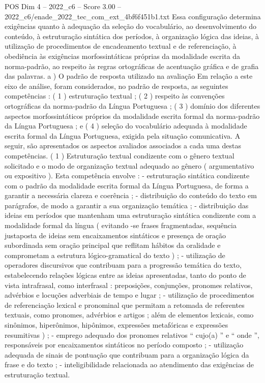 \begin{textsample}{POS Dim 4 – 2022\_c6 – Score 3.00 – 2022\_c6/enade\_2022\_tec\_com\_ext\_4bf6f451b1.txt}
Essa configuração determina exigências quanto à adequação da seleção do vocabulário, ao desenvolvimento do conteúdo, à estruturação sintática dos períodos, à organização lógica das ideias, à utilização de procedimentos de encadeamento textual e de referenciação, à obediência às exigências morfossintáticas próprias da modalidade escrita da norma-padrão, ao respeito às regras ortográficas de acentuação gráfica e de grafia das palavras. a ) O padrão de resposta utilizado na avaliação Em relação a este eixo de análise, foram considerados, no padrão de resposta, as seguintes competências : ( 1 ) estruturação textual ; ( 2 ) respeito às convenções ortográficas da norma-padrão da Língua Portuguesa ; ( 3 ) domínio dos diferentes aspectos morfossintáticos próprios da modalidade escrita formal da norma-padrão da Língua Portuguesa ; e ( 4 ) seleção do vocabulário adequada à modalidade escrita formal da Língua Portuguesa, exigida pela situação comunicativa.
A seguir, são apresentados os aspectos avaliados associados a cada uma destas competências. ( 1 ) Estruturação textual condizente com o gênero textual solicitado e o modo de organização textual adequado ao gênero ( argumentativo ou expositivo ).
Esta competência envolve : - estruturação sintática condizente com o padrão da modalidade escrita formal da Língua Portuguesa, de forma a garantir a necessária clareza e coerência ; - distribuição do conteúdo do texto em parágrafos, de modo a garantir a sua organização temática ; - distribuição das ideias em períodos que mantenham uma estruturação sintática condizente com a modalidade formal da língua ( evitando -se frases fragmentadas, sequência justaposta de ideias sem encaixamentos sintáticos e presença de oração subordinada sem oração principal que reflitam hábitos da oralidade e comprometam a estrutura lógico-gramatical do texto ) ; - utilização de operadores discursivos que contribuam para a progressão temática do texto, estabelecendo relações lógicas entre as ideias apresentadas, tanto do ponto de vista intrafrasal, como interfrasal : preposições, conjunções, pronomes relativos, advérbios e locuções adverbiais de tempo e lugar ; - utilização de procedimentos de referenciação lexical e pronominal que permitam a retomada de referentes textuais, como pronomes, advérbios e artigos ; além de elementos lexicais, como sinônimos, hiperônimos, hipônimos, expressões metafóricas e expressões resumitivas ) ; - emprego adequado dos pronomes relativos “ cujo(a) ” e “ onde ”, responsáveis por encaixamentos sintáticos no período composto ; - utilização adequada de sinais de pontuação que contribuam para a organização lógica da frase e do texto ; - inteligibilidade relacionada ao atendimento das exigências de estruturação textual.

\end{textsample}
